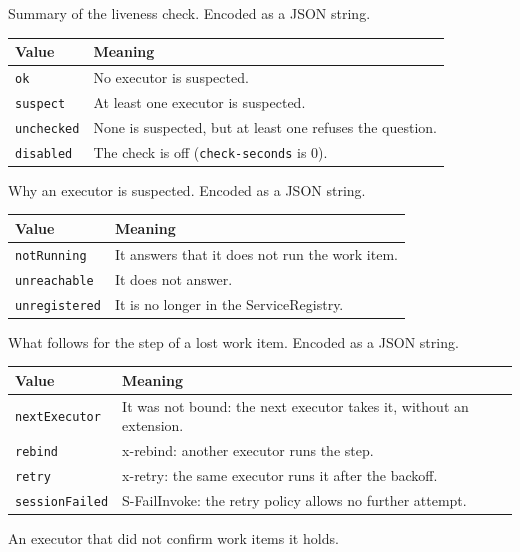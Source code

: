 \documentclass[a4paper]{arrowhead}
\begin{document}
Summary of the liveness check.
 Encoded as a JSON string.
{\small
\begin{longtable}{|p{3.9cm}|p{11.9cm}|}

\hline
\rowcolor{gray!33} Value & Meaning \\ \hline
\endhead
\texttt{ok} & No executor is suspected. \\ \hline
\texttt{suspect} & At least one executor is suspected. \\ \hline
\texttt{unchecked} & None is suspected, but at least one refuses the question. \\ \hline
\texttt{disabled} & The check is off (\texttt{check-seconds} is 0). \\ \hline
\end{longtable}
}

Why an executor is suspected.
 Encoded as a JSON string.
{\small
\begin{longtable}{|p{3.9cm}|p{11.9cm}|}

\hline
\rowcolor{gray!33} Value & Meaning \\ \hline
\endhead
\texttt{notRunning} & It answers that it does not run the work item. \\ \hline
\texttt{unreachable} & It does not answer. \\ \hline
\texttt{unregistered} & It is no longer in the ServiceRegistry. \\ \hline
\end{longtable}
}

What follows for the step of a lost work item.
 Encoded as a JSON string.
{\small
\begin{longtable}{|p{3.9cm}|p{11.9cm}|}

\hline
\rowcolor{gray!33} Value & Meaning \\ \hline
\endhead
\texttt{nextExecutor} & It was not bound: the next executor takes it, without an extension. \\ \hline
\texttt{rebind} & x-rebind: another executor runs the step. \\ \hline
\texttt{retry} & x-retry: the same executor runs it after the backoff. \\ \hline
\texttt{sessionFailed} & S-FailInvoke: the retry policy allows no further attempt. \\ \hline
\end{longtable}
}

An executor that did not confirm work items it holds.
\end{document}
